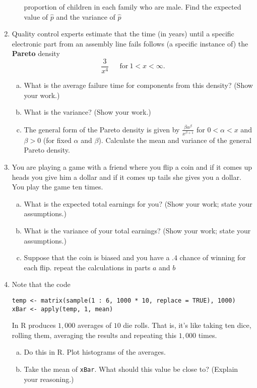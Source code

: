 \documentclass[12pt]{article}
\begin{document}
\begin{enumerate}[Problem 1.]
\begin{enumerate}[a.]
      proportion of  children in each family who are male. Find the expected value of $\hat p$
      and the variance of $\hat p$
    \end{enumerate}
  \item  Quality control experts estimate that the time (in years) until a specific electronic
    part from an assembly line fails follows (a specific instance of) the {\bf Pareto} density
    $$
    \frac{3}{x^4} ~~~~~~~\mbox{for}~ 1 < x < \infty.
    $$
    \begin{enumerate}[a.]
    \item What is the average failure time for components from this density? (Show your work.)
    \item What is the variance? (Show your work.)
    \item The general form of the Pareto density is given by $\frac{\beta \alpha^\beta}{x^{\beta + 1}}$
for $0 < \alpha < x$ and $\beta > 0$ (for fixed $\alpha$ and $\beta$). Calculate the mean and variance of the general Pareto density.
    \end{enumerate}
  \item You are playing a game with a friend where you flip a coin and if it comes up heads you
    give him a dollar and if it comes up tails she gives you a dollar. You play the game ten times.
    \begin{enumerate}[a.]
    \item What is the expected total earnings for you? (Show your work; state your assumptions.)
    \item What is the variance of your total earnings? (Show your work; state your assumptions.)
    \item Suppose that the coin is biased and you have a $.4$ chance of winning for each flip.
      repeat the calculations in parts $a$ and $b$
    \end{enumerate}
  \item Note that the code
\begin{verbatim}
temp <- matrix(sample(1 : 6, 1000 * 10, replace = TRUE), 1000)
xBar <- apply(temp, 1, mean)
\end{verbatim}
    In R produces $1,000$ averages of $10$ die rolls. That is, it's
    like taking ten dice, rolling them, averaging the results and
    repeating this $1,000$ times.
    \begin{enumerate}[a.]
    \item Do this in R. Plot histograms of the averages.
    \item Take the mean of \texttt{xBar}. What should this value be close to? (Explain your reasoning.)

\end{enumerate}
\end{enumerate}
\end{document}
